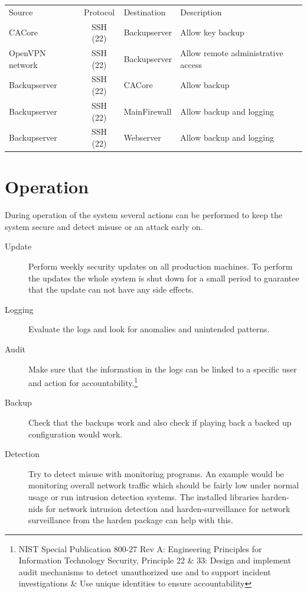 \documentclass[a4paper, toc=index, 12pt, DIV14, twoside, BCOR2cm, headsepline, numbers=noenddot, bibliography=totoc]{report}
\begin{document}
\begin{description}
\begin{tabular}{p{2.5cm} c l p{4.5cm}}
Source & Protocol & Destination & Description\\
\cline{1-4}
CACore & SSH (22) & Backupserver & Allow key backup\\
\cline{1-4}
OpenVPN network & SSH (22) &  Backupserver & Allow remote administrative access\\
\cline{1-4}
Backupserver & SSH (22) & CACore & Allow backup\\
\cline{1-4}
Backupserver & SSH (22) & MainFirewall & Allow backup and logging\\
\cline{1-4}
Backupserver & SSH (22) & Webserver & Allow backup and logging\\
\cline{1-4}
\end{tabular}
\end{description}

\section{Operation}
During operation of the system several actions can be performed to keep the system secure and detect misuse or an attack early on.\newline
\begin{description}
\item[Update ] Perform weekly security updates on all production machines. To perform the updates the whole system is shut down for a small period to guarantee that the update can not have any side effects.
\item[Logging ] Evaluate the logs and look for anomalies and unintended patterns.
\item[Audit ] Make sure that the information in the logs can be linked to a specific user and action for accountability.\footnote{NIST Special Publication 800-27 Rev A: Engineering Principles for Information Technology Security, Principle 22 \& 33: Design and implement audit mechanisms to detect unauthorized use and to support incident investigations \& Use unique identities to ensure accountability}
\item[Backup ] Check that the backups work and also check if playing back a backed up configuration would work.
\item[Detection ] Try to detect misuse with monitoring programs. An example would be monitoring overall network traffic which should be fairly low under normal usage or run intrusion detection systems. The installed libraries harden-nids for network intrusion detection and harden-surveillance for network surveillance from the harden package can help with this.
\end{description}
\end{document}
